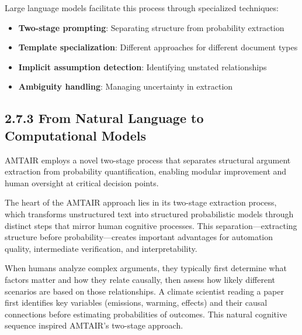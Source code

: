 \documentclass[
  11pt,
  letterpaper,
]{book}
\providecommand{\tightlist}{%
  \setlength{\itemsep}{0pt}\setlength{\parskip}{0pt}}
\begin{document}
Large language models facilitate this process through specialized
techniques:

\begin{itemize}
\tightlist
\item
  \textbf{Two-stage prompting}: Separating structure from probability
  extraction
\item
  \textbf{Template specialization}: Different approaches for different
  document types
\item
  \textbf{Implicit assumption detection}: Identifying unstated
  relationships
\item
  \textbf{Ambiguity handling}: Managing uncertainty in extraction
\end{itemize}

\subsection*{2.7.3 From Natural Language to Computational
Models}\label{sec-natural-to-computational}

\begin{tcolorbox}[enhanced jigsaw, arc=.35mm, titlerule=0mm, breakable, toprule=.15mm, toptitle=1mm, colframe=quarto-callout-tip-color-frame, coltitle=black, bottomrule=.15mm, bottomtitle=1mm, opacityback=0, title=\textcolor{quarto-callout-tip-color}{\faLightbulb}\hspace{0.5em}{The Two-Stage Extraction Process}, rightrule=.15mm, leftrule=.75mm, colback=white, colbacktitle=quarto-callout-tip-color!10!white, opacitybacktitle=0.6, left=2mm]

AMTAIR employs a novel two-stage process that separates structural
argument extraction from probability quantification, enabling modular
improvement and human oversight at critical decision points.

\end{tcolorbox}

The heart of the AMTAIR approach lies in its two-stage extraction
process, which transforms unstructured text into structured
probabilistic models through distinct steps that mirror human cognitive
processes. This separation---extracting structure before
probability---creates important advantages for automation quality,
intermediate verification, and interpretability.

When humans analyze complex arguments, they typically first determine
what factors matter and how they relate causally, then assess how likely
different scenarios are based on those relationships. A climate
scientist reading a paper first identifies key variables (emissions,
warming, effects) and their causal connections before estimating
probabilities of outcomes. This natural cognitive sequence inspired
AMTAIR's two-stage approach.
\end{document}

